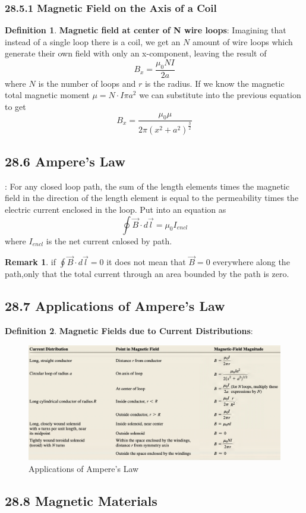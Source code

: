 \documentclass[12pt]{amsart}
\theoremstyle{definition}
\newtheorem{definition}{Definition} %
\newtheorem*{remark}{Remark}        %
\numberwithin{equation}{theorem}    %
\begin{document}
\subsubsection*{28.5.1 Magnetic Field on the Axis of a Coil}

\begin{definition}
    \textbf{Magnetic field at center of N wire loops}:
    Imagining that instead of a single loop there is a coil, we get an $N$ amount of wire loops which generate their own field with only an x-component, leaving the result of $$B_x = \frac{\mu_0NI}{2a}$$
    where $N$ is the number of loops and $r$ is the radius. If we know the magnetic total magnetic moment $\mu = N\cdot I\pi a^2$ we can substitute into the previous equation to get 
    $$B_x = \frac{\mu_0 \mu}{2\pi(x^2+a^2)^{\frac{3}{2}}} $$
\end{definition}

\subsection*{28.6 Ampere's Law}:
For any closed loop path, the sum of the length elements times the magnetic field in the direction of the length element is equal to the permeability times the electric current enclosed in the loop. Put into an equation as 
$$\oint\vec{B} \cdot d\vec{l} = \mu_0I_{encl}$$ where $I_{encl}$ is the net current cnlosed by path.

\begin{remark}
    if $\oint\vec{B} \cdot d\vec{l} = 0$ it does not mean that $\vec{B} = 0$  everywhere along the path,only that the total current through an area bounded by the path is zero.
\end{remark}

\subsection*{28.7 Applications of Ampere's Law}

\begin{definition}
    \textbf{Magnetic Fields due to Current Distributions}:
\end{definition}
\begin{figure}[H]
    \centering
    \includegraphics[width=6.5in]{Media/table.png}
    \caption{Applications of Ampere's Law}
    \label{Applications of Ampere's Law}
\end{figure} 

\subsection*{28.8 Magnetic Materials}
\end{document}
